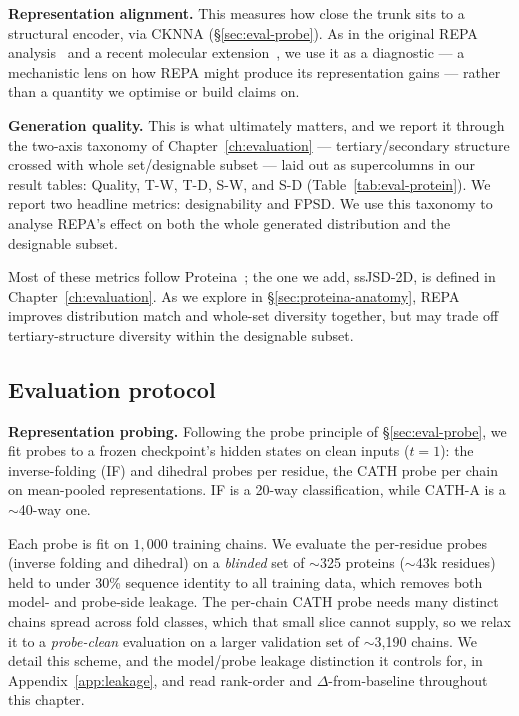 \documentclass[12pt,a4paper,twoside]{report}
\begin{document}
\textbf{Representation alignment.} This measures how close the trunk sits to a structural encoder, via CKNNA (\S\ref{sec:eval-probe}). As in the original REPA analysis~\cite{REPA} and a recent molecular extension~\cite{BoltzREPA}, we use it as a diagnostic --- a mechanistic lens on how REPA might produce its representation gains --- rather than a quantity we optimise or build claims on.

\textbf{Generation quality.} This is what ultimately matters, and we report it through the two-axis taxonomy of Chapter~\ref{ch:evaluation} --- tertiary/secondary structure crossed with whole set/designable subset --- laid out as supercolumns in our result tables: Quality, T-W, T-D, S-W, and S-D (Table~\ref{tab:eval-protein}). We report two headline metrics: designability and FPSD. We use this taxonomy to analyse REPA's effect on both the whole generated distribution and the designable subset.

Most of these metrics follow Proteina~\cite{Proteina}; the one we add, ssJSD-2D, is defined in Chapter~\ref{ch:evaluation}. As we explore in \S\ref{sec:proteina-anatomy}, REPA improves distribution match and whole-set diversity together, but may trade off tertiary-structure diversity within the designable subset.

\subsection{Evaluation protocol}
\label{sec:eval-protocol}

\textbf{Representation probing.} Following the probe principle of \S\ref{sec:eval-probe}, we fit probes to a frozen checkpoint's hidden states on clean inputs ($t{=}1$): the inverse-folding (IF) and dihedral probes per residue, the CATH probe per chain on mean-pooled representations. IF is a 20-way classification, while CATH-A is a $\sim$40-way one.

Each probe is fit on $1{,}000$ training chains. We evaluate the per-residue probes (inverse folding and dihedral) on a \emph{blinded} set of $\sim$325 proteins ($\sim$43k residues) held to under 30\% sequence identity to all training data, which removes both model- and probe-side leakage. The per-chain CATH probe needs many distinct chains spread across fold classes, which that small slice cannot supply, so we relax it to a \emph{probe-clean} evaluation on a larger validation set of $\sim$3{,}190 chains. We detail this scheme, and the model/probe leakage distinction it controls for, in Appendix~\ref{app:leakage}, and read rank-order and $\Delta$-from-baseline throughout this chapter.
\end{document}
